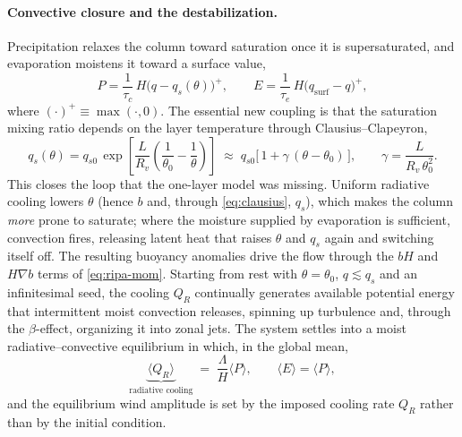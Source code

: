 \documentclass{article}
\begin{document}
\paragraph{Convective closure and the destabilization.} Precipitation relaxes the column toward saturation once it is supersaturated, and evaporation moistens it toward a surface value,
\begin{equation}
    P = \frac{1}{\tau_c}\,H\big(q-q_s(\theta)\big)^{+},
    \qquad
    E = \frac{1}{\tau_e}\,H\big(q_{\mathrm{surf}}-q\big)^{+},
\end{equation}
where $(\cdot)^+\equiv\max(\cdot,0)$. The essential new coupling is that the saturation mixing ratio depends on the layer temperature through Clausius--Clapeyron,
\begin{equation}
    q_s(\theta) = q_{s0}\,\exp\!\left[\frac{L}{R_v}\left(\frac{1}{\theta_0}-\frac{1}{\theta}\right)\right]
    \;\approx\; q_{s0}\big[\,1 + \gamma\,(\theta-\theta_0)\,\big],
    \qquad \gamma=\frac{L}{R_v\,\theta_0^{2}}.
    \label{eq:clausius}
\end{equation}
This closes the loop that the one-layer model was missing. Uniform radiative cooling lowers $\theta$ (hence $b$ and, through \eqref{eq:clausius}, $q_s$), which makes the column \emph{more} prone to saturate; where the moisture supplied by evaporation is sufficient, convection fires, releasing latent heat that raises $\theta$ and $q_s$ again and switching itself off. The resulting buoyancy anomalies drive the flow through the $bH$ and $H\nabla b$ terms of \eqref{eq:ripa-mom}. Starting from rest with $\theta=\theta_0$, $q\lesssim q_s$ and an infinitesimal seed, the cooling $Q_R$ continually generates available potential energy that intermittent moist convection releases, spinning up turbulence and, through the $\beta$-effect, organizing it into zonal jets. The system settles into a moist radiative--convective equilibrium in which, in the global mean,
\begin{equation}
    \underbrace{\langle Q_R\rangle}_{\text{radiative cooling}} \;=\; \frac{\Lambda}{H}\langle P\rangle ,
    \qquad
    \langle E\rangle = \langle P\rangle ,
\end{equation}
and the equilibrium wind amplitude is set by the imposed cooling rate $Q_R$ rather than by the initial condition.
\end{document}

